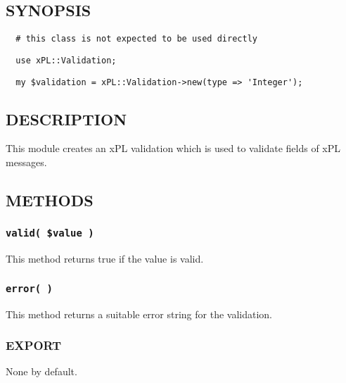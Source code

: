 \documentclass[12pt,a4paper]{article}
\begin{document}
\subsection*{SYNOPSIS\label{xPL::Validation::Integer_SYNOPSIS}}
\begin{verbatim}
  # this class is not expected to be used directly
\end{verbatim}
\begin{verbatim}
  use xPL::Validation;
\end{verbatim}
\begin{verbatim}
  my $validation = xPL::Validation->new(type => 'Integer');
\end{verbatim}
\subsection*{DESCRIPTION\label{xPL::Validation::Integer_DESCRIPTION}}


This module creates an xPL validation which is used to validate fields
of xPL messages.

\subsection*{METHODS\label{xPL::Validation::Integer_METHODS}}
\subsubsection*{\texttt{valid( \$value )}\label{xPL::Validation::Integer_valid_value_}}


This method returns true if the value is valid.

\subsubsection*{\texttt{error( )}\label{xPL::Validation::Integer_error_}}


This method returns a suitable error string for the validation.

\subsubsection*{EXPORT\label{xPL::Validation::Integer_EXPORT}}


None by default.
\end{document}
